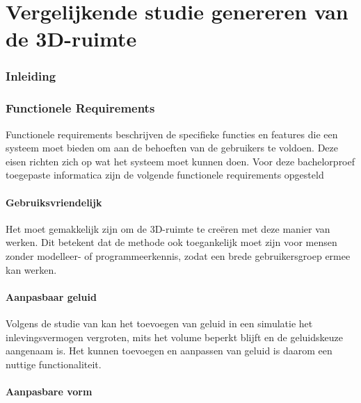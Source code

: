 
\chapter{Vergelijkende studie genereren van de 3D-ruimte}%
\label{ch:requirements1}

\subsection{Inleiding}

\subsection{Functionele Requirements}

Functionele requirements beschrijven de specifieke functies en features die een systeem moet bieden om aan de behoeften van de gebruikers te voldoen. Deze eisen richten zich op wat het systeem moet kunnen doen. Voor deze bachelorproef toegepaste informatica zijn de volgende functionele requirements opgesteld

\subsubsection{Gebruiksvriendelijk}

Het moet gemakkelijk zijn om de 3D-ruimte te creëren met deze manier van werken. Dit betekent dat de methode ook toegankelijk moet zijn voor mensen zonder modelleer- of programmeerkennis, zodat een brede gebruikersgroep ermee kan werken.

\subsubsection{Aanpasbaar geluid}

Volgens de studie van \textcite{Raes2023} kan het toevoegen van geluid in een simulatie het inlevingsvermogen vergroten, mits het volume beperkt blijft en de geluidskeuze aangenaam is. Het kunnen toevoegen en aanpassen van geluid is daarom een nuttige functionaliteit.

\subsubsection{Aanpasbare vorm}

